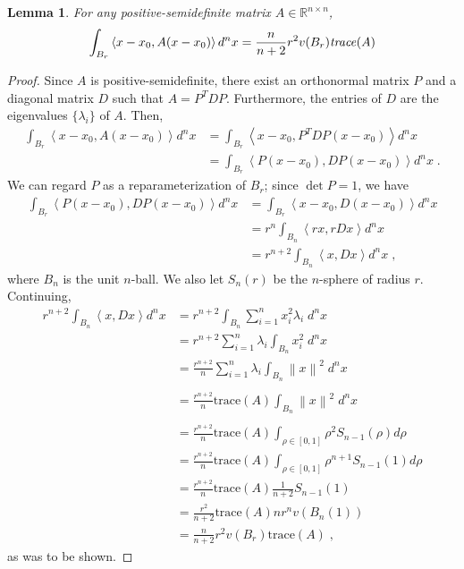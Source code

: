 \documentclass[english]{scrartcl}
\newtheorem{lm}{Lemma}
\newcommand\R[0]{\mathbb{R}}
\newcommand{\norm}[1]{\left\lVert#1\right\rVert}
\begin{document}
	\begin{lm} For any positive-semidefinite matrix $A \in \R^{n\times n}$, 
		$$\int_{B_r} \left< x - x_0, A(x-x_0) \right> d^n x = \frac{n}{n+2} r^{2} v(B_r) \text{\emph{trace}} (A)$$
	\end{lm}
		
	\begin{proof}
		Since $A$ is positive-semidefinite, there exist an orthonormal matrix $P$ and a diagonal matrix $D$ such that $A = P^TDP$. Furthermore, the entries of $D$ are the eigenvalues $\{\lambda_i\}$ of $A$. Then, 
		\begin{align}
			\int_{B_r} \left< x - x_0, A(x-x_0) \right> d^n x &= \int_{B_r} \left< x - x_0, P^T DP(x-x_0) \right> d^n x\\
			&= \int_{B_r} \left< P(x - x_0),  DP(x-x_0) \right> d^n x \;.
		\end{align}
		We can regard $P$ as a reparameterization of $B_r$; since $\det P = 1$, we have 
		\begin{align}
			\int_{B_r} \left< P(x - x_0),  DP(x-x_0) \right> d^n x &= \int_{B_r} \left< x - x_0,  D(x-x_0) \right> d^n x \\
			&= r^n\int_{B_n} \left< rx, rDx \right> d^n x \\
			&= r^{n+2}\int_{B_n} \left< x, Dx \right> d^n x \;,
		\end{align}
		where $B_n$ is the unit $n$-ball. We also let $S_n(r)$ be the $n$-sphere of radius $r$. Continuing, 
		\begin{align}
			r^{n+2}\int_{B_n} \left< x, Dx \right> d^n x &= r^{n+2} \int_{B_n} \sum_{i= 1}^n x_i^2 \lambda_i \; d^nx \\
			&= r^{n+2} \sum_{i = 1}^n \lambda _i \int_{B_n} x_i^2 \; d^nx \\
			&= \frac{r^{n+2}}{n} \sum_{i = 1}^n \lambda _i \int_{B_n} \norm{x}^2 \; d^nx \\ \tag{spherical symmetry} \\
			&= \frac{r^{n+2}}{n} \text{trace}(A)  \int_{B_n} \norm{x}^2 \; d^nx \\ \tag{spherical symmetry} \\
			&= \frac{r^{n+2}}{n} \text{trace} (A) \int_{\rho \in [0,1]} \rho^2 S_{n-1}(\rho) d\rho \\
			&= \frac{r^{n+2}}{n} \text{trace} (A) \int_{\rho \in [0,1]} \rho^{n+1} S_{n-1}(1) d\rho \\
			&= \frac{r^{n+2}}{n} \text{trace} (A)  \frac{1}{n+2} S_{n-1}(1) \\
			&= \frac{r^2}{n+2}  \text{trace} (A)  n r^{n}v(B_n(1)) \\
			&= \frac{n}{n+2} r^{2} v(B_r) \text{trace} (A)\;,
		\end{align}
		as was to be shown. 
	\end{proof}
\end{document}
